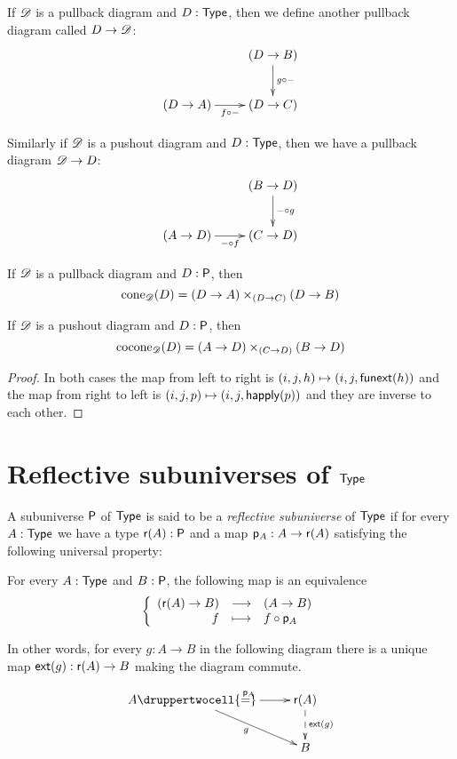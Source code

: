 \begin{defn}
  If $\Ddiag$ is a pullback diagram and $D:\type$, then we define another
  pullback diagram called $D\to\Ddiag$:
  \[\xymatrix{& (D\to B) \ar^{g\circ-}[d] \\ (D\to A) \ar_{f\circ-}[r] & (D\to
    C)}\]

  Similarly if $\Ddiag$ is a pushout diagram and $D:\type$, then we have a
  pullback diagram $\Ddiag\to{}D$:
  \[\xymatrix{& (B\to D) \ar^{-\circ{}g}[d] \\ (A\to D) \ar_{-\circ{}f}[r] &
    (C\to D)}\]
\end{defn}

\begin{lem}
  \label{coneispb}
  If $\Ddiag$ is a pullback diagram and $D:\P$, then
  \[\cone{\Ddiag}{D}=(D\to{}A)\times_{(D\to{}C)}(D\to{}B)\]

  If $\Ddiag$ is a pushout diagram and $D:\P$, then
  \[\cocone{\Ddiag}{D}=(A\to{}D)\times_{(C\to{}D)}(B\to{}D)\]
\end{lem}
\begin{proof}
  In both cases the map from left to right is $(i,j,h)\mapsto(i,j,\funext(h))$
  and the map from right to left is $(i,j,p)\mapsto(i,j,\happly(p))$ and they
  are inverse to each other.
\end{proof}

\section{Reflective subuniverses of $\type$}

\begin{defn}
  A subuniverse $\P$ of $\type$ is said to be a \emph{reflective subuniverse} of
  $\type$ if for every $A:\type$ we have a type $\reflect(A):\P$ and a map
  $\project_A:A\to\reflect(A)$ satisfying the following universal property:

  For every $A:\type$ and $B:\P$, the following map is an equivalence
  \[\function{(\reflect(A)\to{}B)}{(A\to{}B)}{f}{f\circ\project_A}\]

  In other words, for every $g:A\to{}B$ in the following diagram there is a
  unique map $\ext(g):\reflect(A)\to{}B$ making the diagram commute.

  \[\uppercurveobject{{ }}\lowercurveobject{{ }}\twocellhead{{ }}
  \xymatrix{A \ar^{\project_A}[r] \ar_g[rd] \druppertwocell{=} & \reflect(A)
    \ar@{-->}^{\ext(g)}[d] \\
    & B}\]
\end{defn}

